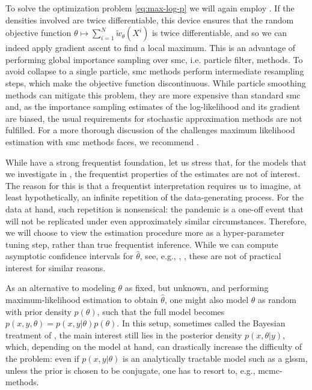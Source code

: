 To solve the optimization problem \eqref{eq:max-log-p} we will again employ . If the densities involved are twice differentiable, this device ensures that the random objective function $\theta \mapsto \sum_{i = 1}^N \tilde w_{\theta}(X^{i})$ is twice differentiable, and so we can indeed apply gradient ascent to find a local maximum. This is an advantage of performing global importance sampling over \acrshort{smc}, i.e. particle filter, methods. To avoid collapse to a single particle, \acrshort{smc} methods perform intermediate resampling steps, which make the objective function discontinuous. While particle smoothing methods can mitigate this problem, they are more expensive than standard \acrshort{smc} and, as the importance sampling estimates of the log-likelihood and its gradient are biased, the usual requirements for stochastic approximation methods are not fulfilled. 
For a more thorough discussion of the challenges maximum likelihood estimation with \acrshort{smc} methods faces, we recommend \citep[Chapter 14]{Chopin2020Introduction}.

While  have a strong frequentist foundation, let us stress that, for the models that we investigate in , the frequentist properties of the estimates are not of interest. The reason for this is that a frequentist interpretation requires us to imagine, at least hypothetically, an infinite repetition of the data-generating process. For the data at hand, such repetition is nonsensical: the pandemic is a \glqq{}one-off\grqq{} event that will not be replicated under even approximately similar circumstances. Therefore, we will choose to view the estimation procedure more as a hyper-parameter tuning step, rather than true frequentist inference. While we can compute asymptotic confidence intervals for $\hat\theta$, see, e.g., \citep[Chapter 11.6]{Durbin2012Time}, \citep[Chapter 14.8]{Chopin2020Introduction}, these are not of practical interest for similar reasons. 

As an alternative to modeling $\theta$ as fixed, but unknown, and performing maximum-likelihood estimation to obtain $\hat \theta$, one might also model $\theta$ as random with prior density $p(\theta)$, such that the full model becomes $p(x,y,\theta) = p(x,y|\theta)p(\theta)$. In this setup, sometimes called the Bayesian treatment of  \citep[Section 13.1]{Durbin2012Time}, the main interest still lies in the posterior density $p(x,\theta|y)$, which, depending on the model at hand, can drastically increase the difficulty of the problem: even if $p(x,y|\theta)$ is an analytically tractable model such as a \acrshort{glssm}, unless the prior is chosen to be conjugate, one has to resort to, e.g., \acrshort{mcmc}-methods. 

